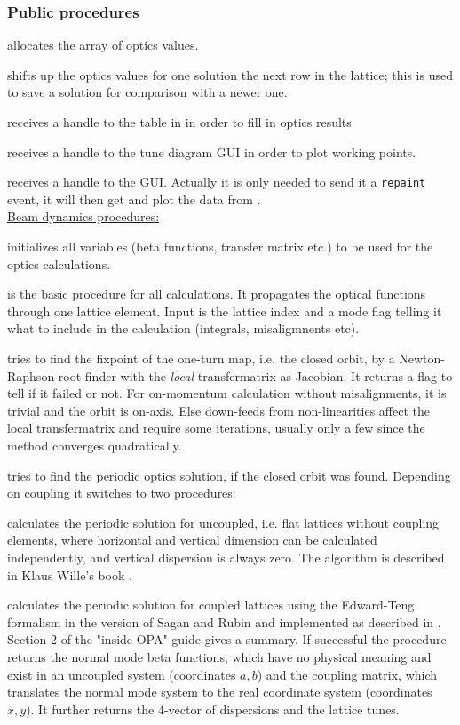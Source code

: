 \documentclass[12pt]{article}
\newcommand\code[1]{{\tt #1}}
\newcommand{\unico}[1]{{\color{burntorange}\code{#1}}}
\newcommand{\opagui}[1]{\colorbox{blue!20}{{\color{black}\code{#1}}}}
\newcommand{\ogui}[1]{\hyperref[#1]{\opagui{#1}}}
\newcommand{\opauni}[1]{\colorbox{orange!30}{{\color{black}\code{#1}}}}
\newcommand{\ouni}[1]{\hyperref[#1]{\opauni{#1}}}
\newcommand{\ppro}[1]{\subsubsection*{Public procedures} #1}
\begin{document}
\ppro{
\unico{allocOpval} allocates the array of optics values.

\unico{shiftOpval} shifts up the optics values for one solution the next row in the lattice; this is used to save a solution for comparison with a newer one.

\unico{setTabHandle} receives a handle to the table in \ogui{opalinop} in order to fill in optics results

\unico{setTunePlotHandle} receives a handle to the tune diagram GUI \ogui{opatunediag} in order to plot working points.

\unico{setOrbitHandle} receives a handle to the \ogui{opaorbit} GUI. Actually it is only needed to send it a \code{repaint} event, it will then get and plot the data from \ouni{linoplib}.\\

\underline{Beam dynamics procedures:}

\unico{OptInit} initializes all variables (beta functions, transfer matrix etc.) to be used for the optics calculations.

\unico{Lattel} is the basic procedure for all calculations. It propagates the optical functions through one lattice element. Input is the lattice index and a mode flag telling it what to include in the calculation (integrals, misaligmnents etc). 

\unico{ClosedOrbit} tries to find the fixpoint of the one-turn map, i.e. the closed orbit, by a Newton-Raphson root finder with the {\em local} transfermatrix as Jacobian. It returns a flag to tell if it failed or not. For on-momentum calculation without misalignments, it is trivial and the orbit is on-axis. Else down-feeds from non-linearities affect the local transfermatrix and require some iterations, usually only a few since the method converges quadratically.

\unico{Periodic} tries to find the periodic optics solution, if the closed orbit was found. Depending on coupling it switches to two procedures:

\unico{Flatperiodic} calculates the periodic solution for uncoupled, i.e. flat lattices without coupling elements, where horizontal and vertical dimension can be calculated independently, and vertical dispersion is always zero. The algorithm is described in Klaus Wille's book \cite{kwille}.

\unico{NormalMode} calculates the periodic solution for coupled lattices using the Edward-Teng formalism in the version of Sagan and Rubin and implemented as described in \cite{VZAS}. Section 2 of the "inside OPA" guide \cite{inside} gives a summary. If successful the procedure returns the normal mode beta functions, which have no physical meaning and exist in an uncoupled system (coordinates $a,b$) and the coupling matrix, which translates the normal mode system to the real coordinate system (coordinates $x,y$). It further returns the 4-vector of dispersions and the lattice tunes.

}
\end{document}
